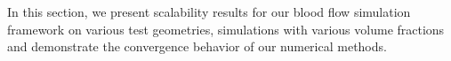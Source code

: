 
In this section, we present scalability results for our blood flow simulation
framework on various test geometries, simulations with various volume fractions 
and demonstrate the convergence behavior of our numerical methods.

